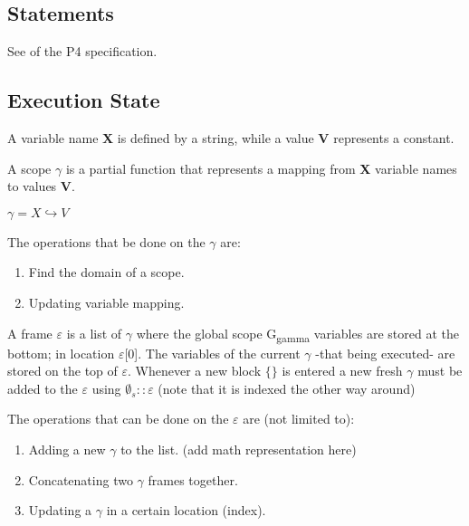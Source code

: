 \documentclass[UTF8]{article}
\begin{document}
\newpage
\subsection{Statements}
\newcommand{\stmt}{\textit{stmt}}
\label{ssec:stmt}
See  of the P4 specification.


\newpage
\newcommand{\state}{\Sigma}
\newcommand{\scope}{\ensuremath{\mathit{scope}}}
\newcommand{\stacks}{\sigma}
\newcommand{\currsf}{\ensuremath{\varepsilon}}
\newcommand{\gscope}{\ensuremath{\currsf [0] }}
\newcommand{\cstack}{E}
\newcommand{\status}{\textit{status}}
\newcommand{\running}{\textbf{R}}
\newcommand{\returnst}{\textbf{Ret}}
\newcommand{\accept}{\textbf{Accept}}
\newcommand{\reject}[1]{\textbf{Reject} #1}
\newcommand{\trans}[1]{\textbf{Trans} #1}
\newcommand{\sterr}{\ensuremath{\bot}}
\newcommand{\pfin}{\ensuremath{p_{\mathrm{fin}}}}
\subsection{Execution State}
A variable name \textbf{X} is defined by a string, while a value \textbf{V} represents a constant.

A scope $\gamma$ is a partial function that represents a mapping from \textbf{X} variable names to values \textbf{V}.

$\gamma = X \hookrightarrow V$

The operations that be done on the $\gamma$ are:
\begin{enumerate}
\item Find the domain of a scope.
\item Updating variable mapping.
\end{enumerate}

A frame $\currsf$ is a list of $\gamma$ where the global scope G\textsubscript{gamma} variables are stored at the bottom; in location $\currsf$[0]. The variables of the current $\gamma$ -that being executed- are stored on the top of $\currsf$. Whenever a new block $\{ \}$ is entered a new fresh $\gamma$ must be added to the $\currsf$ using $ \emptyset _{s}:: \currsf$ (note that it is indexed the other way around)

The operations that can be done on the $\currsf$ are (not limited to):
\begin{enumerate}
\item Adding a new $\gamma$ to the list. (add math representation here)
\item Concatenating two $\gamma$ frames together.
\item Updating a $\gamma$ in a certain location (index).
\end{enumerate}
\end{document}

